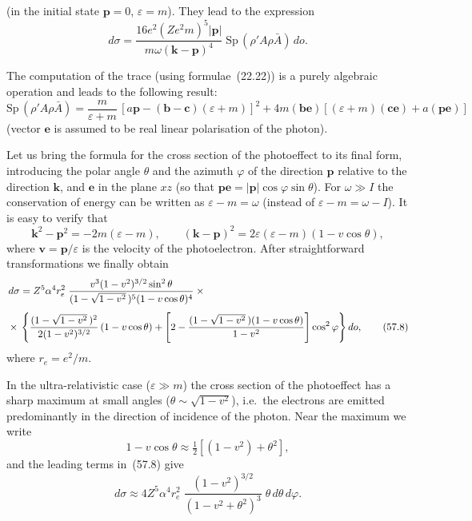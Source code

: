 (in the initial state $\mathbf{p} = 0$, $\varepsilon = m$). They lead to the expression
\[
d\sigma = \frac{16e^2(Ze^2m)^5|\mathbf{p}|}{m\omega(\mathbf{k}-\mathbf{p})^4}\;\mathrm{Sp}\,(\rho'A\rho\bar{A})\,do.
\]

The computation of the trace (using formulae~(22.22)) is a purely algebraic operation and leads to the following result:
\[
\mathrm{Sp}\,(\rho'A\rho\bar{A}) = \frac{m}{\varepsilon+m}\,[a\mathbf{p} - (\mathbf{b} - \mathbf{c})(\varepsilon + m)]^2 + 4m(\mathbf{be})[(\varepsilon + m)(\mathbf{ce}) + a(\mathbf{pe})]
\]
(vector $\mathbf{e}$ is assumed to be real linear polarisation of the photon).

Let us bring the formula for the cross section of the photoeffect to its final form, introducing the polar angle $\theta$ and the azimuth $\varphi$ of the direction $\mathbf{p}$ relative to the direction $\mathbf{k}$, and $\mathbf{e}$ in the plane $xz$ (so that $\mathbf{pe} = |\mathbf{p}|\cos\varphi\sin\theta$). For $\omega \gg I$ the conservation of energy can be written as $\varepsilon - m = \omega$ (instead of $\varepsilon - m = \omega - I$). It is easy to verify that
\[
\mathbf{k}^2 - \mathbf{p}^2 = -2m(\varepsilon - m),\qquad (\mathbf{k}-\mathbf{p})^2 = 2\varepsilon(\varepsilon - m)(1 - v\cos\theta),
\]
where $\mathbf{v} = \mathbf{p}/\varepsilon$ is the velocity of the photoelectron. After straightforward transformations we finally obtain
\begin{align}
d\sigma &= Z^5\alpha^4 r^2_e\;\frac{v^3(1-v^2)^{3/2}\sin^2\theta}{(1-\sqrt{1-v^2}\,)^5(1-v\cos\theta)^4}\times{}\notag\\[4pt]
{}\times{}&\left\{\frac{(1-\sqrt{1-v^2}\,)^2}{2(1-v^2)^{3/2}}\,(1-v\cos\theta) + \left[2 - \frac{(1-\sqrt{1-v^2}\,)(1-v\cos\theta)}{1-v^2}\right]\cos^2\varphi\right\}do,
\tag{57.8}
\end{align}
where $r_e = e^2/m$.

In the ultra-relativistic case ($\varepsilon \gg m$) the cross section of the photoeffect has a sharp maximum at small angles ($\theta \sim \sqrt{1-v^2}$), i.e.\ the electrons are emitted predominantly in the direction of incidence of the photon. Near the maximum we write
\[
1 - v\cos\theta \approx \tfrac{1}{2}[(1 - v^2) + \theta^2],
\]
and the leading terms in~(57.8) give
\begin{equation}
d\sigma \approx 4Z^5\alpha^4 r^2_e\;\frac{(1-v^2)^{3/2}}{(1-v^2+\theta^2)^3}\;\theta\,d\theta\,d\varphi.
\tag{57.9}
\end{equation}

